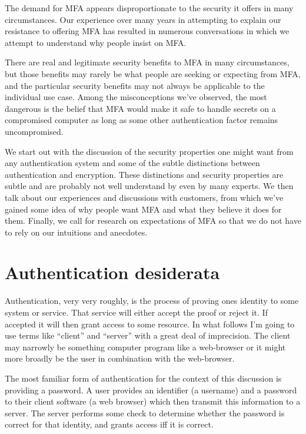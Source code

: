 \documentclass{soups}
\begin{document}
The demand for MFA appears disproportionate to the security it offers in many circumstances. Our experience over many years in attempting to explain our resistance to offering MFA has resulted in numerous conversations in which we attempt to understand why people insist on MFA.\@

There are real and legitimate security benefits to MFA in many circumstances, but those benefits may rarely be what people are seeking or expecting from MFA, and the particular security benefits may not always be applicable to the individual use case.
Among the misconceptions we've observed, the most dangerous is the belief that
MFA would make it safe to handle secrets on a compromised computer as long as some other authentication factor remains uncompromised.

We start out with the discussion of the security properties one might want from any authentication system and some of the subtle distinctions between authentication and encryption.
These distinctions and security properties are subtle and are probably not well understand by even by many experts. 
We then talk about our experiences and discussions with customers, from which we've gained some idea of why people want MFA and what they believe it does for them.
Finally, we call for research on expectations of MFA so that we do not have to rely on our intuitions and anecdotes.

\section{Authentication desiderata}\label{sec:desiderata}

Authentication, very very roughly, is the process of proving ones identity to some system or service.
That service will either accept the proof or reject it.
If accepted it will then grant access to some resource. In what follows I'm going to use terms like ``client'' and ``server'' with a great deal of imprecision. The client may narrowly be something computer program like a web-browser or it might more broadly be the user in combination with the web-browser.

The most familiar form of authentication for the context of this discussion is providing a password. A user provides an identifier (a username) and a password to their client software (a web browser) which then transmit this information to a server. The server performs some check to determine whether the password is correct for that identity, and grants access iff it is correct.
\end{document}
